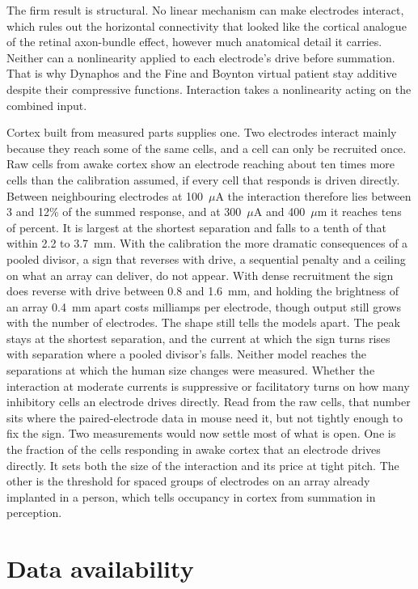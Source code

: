\documentclass[10pt,twocolumn]{article}
\newcommand{\um}{\ensuremath{\mu\text{m}}}
\newcommand{\uA}{\ensuremath{\mu\text{A}}}
\begin{document}
The firm result is structural. No linear mechanism can make electrodes
interact, which rules out the horizontal connectivity that looked like the
cortical analogue of the retinal axon-bundle effect, however much
anatomical detail it carries. Neither can a nonlinearity applied to each
electrode's drive before summation. That is why Dynaphos and the Fine and
Boynton virtual patient stay additive despite their compressive functions.
Interaction takes a nonlinearity acting on the combined input.

Cortex built from measured parts supplies one. Two electrodes interact
mainly because they reach some of the same cells, and a cell can only be
recruited once. Raw cells from awake cortex show an electrode reaching
about ten times more cells than the calibration assumed, if every cell
that responds is driven directly. Between neighbouring electrodes at
100~\uA{} the interaction therefore lies between 3 and 12\% of the
summed response, and at 300~\uA{} and 400~\um{} it reaches tens of
percent. It is largest at the shortest separation and falls to a tenth of
that within 2.2 to 3.7~mm. With the calibration the more dramatic
consequences of a pooled divisor, a sign that reverses with drive, a
sequential penalty and a ceiling on what an array can deliver, do not
appear. With dense recruitment the sign does reverse with drive between
0.8 and 1.6~mm, and holding the brightness of an array 0.4~mm apart costs
milliamps per electrode, though output still grows with the number of
electrodes. The shape still tells the models apart. The peak stays at the
shortest separation, and the current at which the sign turns rises with
separation where a pooled divisor's falls. Neither model reaches the
separations at which the human size changes were measured. Whether the interaction at moderate
currents is suppressive or facilitatory turns on how many inhibitory
cells an electrode drives directly. Read from the raw cells, that number
sits where the paired-electrode data in mouse need it, but not tightly
enough to fix the sign. Two measurements would now settle most of what is
open. One is the fraction of the cells responding in awake cortex that an
electrode drives directly. It sets both the size of the interaction and
its price at tight pitch. The other is the threshold for spaced groups of
electrodes on an array already implanted in a person, which tells
occupancy in cortex from summation in perception.

\section*{Data availability}
\end{document}
